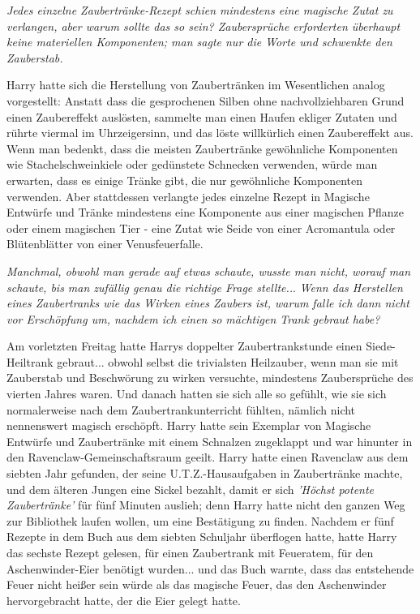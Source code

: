 \emph{Jedes einzelne Zaubertränke-Rezept schien mindestens eine magische Zutat zu verlangen, aber warum sollte das so sein? Zaubersprüche erforderten überhaupt keine materiellen Komponenten; man sagte nur die Worte und schwenkte den Zauberstab.}

Harry hatte sich die Herstellung von Zaubertränken im Wesentlichen analog
vorgestellt: Anstatt dass die gesprochenen Silben ohne nachvollziehbaren Grund
einen Zaubereffekt auslösten, sammelte man einen Haufen ekliger Zutaten und
rührte viermal im Uhrzeigersinn, und das löste willkürlich einen Zaubereffekt
aus. Wenn man bedenkt, dass die meisten Zaubertränke gewöhnliche Komponenten wie
Stachelschweinkiele oder gedünstete Schnecken verwenden, würde man erwarten,
dass es einige Tränke gibt, die nur gewöhnliche Komponenten verwenden. Aber
stattdessen verlangte jedes einzelne Rezept in Magische Entwürfe und Tränke
mindestens eine Komponente aus einer magischen Pflanze oder einem magischen Tier
- eine Zutat wie Seide von einer Acromantula oder Blütenblätter von einer
Venusfeuerfalle.

\emph{Manchmal, obwohl man gerade auf etwas schaute, wusste man nicht, worauf
man schaute, bis man zufällig genau die richtige Frage stellte..}.
\emph{Wenn das Herstellen eines Zaubertranks wie das Wirken eines Zaubers ist, warum falle ich dann nicht vor Erschöpfung um, nachdem ich einen so mächtigen Trank gebraut habe?}

Am vorletzten Freitag hatte Harrys doppelter Zaubertrankstunde einen
Siede-Heiltrank gebraut... obwohl selbst die trivialsten Heilzauber, wenn man
sie mit Zauberstab und Beschwörung zu wirken versuchte, mindestens Zaubersprüche
des vierten Jahres waren. Und danach hatten sie sich alle so gefühlt, wie sie
sich normalerweise nach dem Zaubertrankunterricht fühlten, nämlich nicht
nennenswert magisch erschöpft. Harry hatte sein Exemplar von Magische Entwürfe
und Zaubertränke mit einem Schnalzen zugeklappt und war hinunter in den
Ravenclaw-Gemeinschaftsraum geeilt. Harry hatte einen Ravenclaw aus dem siebten
Jahr gefunden, der seine U.T.Z.-Hausaufgaben in Zaubertränke machte, und dem
älteren Jungen eine Sickel bezahlt, damit er sich \emph{'Höchst potente
Zaubertränke'} für fünf Minuten auslieh; denn Harry hatte nicht den ganzen Weg
zur Bibliothek laufen wollen, um eine Bestätigung zu finden. Nachdem er fünf
Rezepte in dem Buch aus dem siebten Schuljahr überflogen hatte, hatte Harry das
sechste Rezept gelesen, für einen Zaubertrank mit Feueratem, für den
Aschenwinder-Eier benötigt wurden... und das Buch warnte, dass das entstehende
Feuer nicht heißer sein würde als das magische Feuer, das den Aschenwinder
hervorgebracht hatte, der die Eier gelegt hatte.


